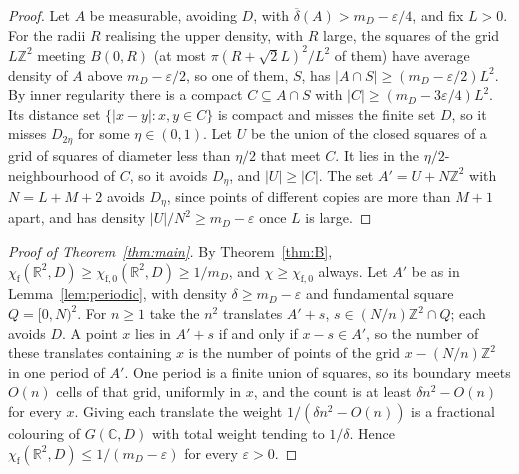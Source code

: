 \documentclass[11pt,a4paper]{amsart}
\theoremstyle{definition}
\theoremstyle{remark}
\newcommand{\C}{\mathbb{C}}
\newcommand{\R}{\mathbb{R}}
\newcommand{\Z}{\mathbb{Z}}
\newcommand{\dens}{\overline{\delta}}
\newcommand{\chif}{\chi_{\mathrm f}}
\begin{document}
\begin{proof}
Let $A$ be measurable, avoiding $D$, with $\dens(A)>m_D-\varepsilon/4$, and fix $L>0$. For the radii $R$ realising
the upper density, with $R$ large, the squares of the grid $L\Z^2$ meeting $B(0,R)$ (at most $\pi(R+\sqrt2L)^2/L^2$
of them) have average density of $A$ above $m_D-\varepsilon/2$, so one of them, $S$, has
$|A\cap S|\ge(m_D-\varepsilon/2)L^2$. By inner regularity there is a compact $C\subseteq A\cap S$ with
$|C|\ge(m_D-3\varepsilon/4)L^2$. Its distance set $\{|x-y|:x,y\in C\}$ is compact and misses the finite set $D$, so
it misses $D_{2\eta}$ for some $\eta\in(0,1)$. Let $U$ be the union of the closed squares of a grid of squares of
diameter less than $\eta/2$ that meet $C$. It lies in the $\eta/2$-neighbourhood of $C$, so it avoids $D_\eta$, and
$|U|\ge|C|$. The set $A'=U+N\Z^2$ with $N=L+M+2$ avoids $D_\eta$, since points of different copies are more than
$M+1$ apart, and has density $|U|/N^2\ge m_D-\varepsilon$ once $L$ is large.
\end{proof}

\begin{proof}[Proof of Theorem~\ref{thm:main}]
By Theorem~\ref{thm:B}, $\chif(\R^2,D)\ge\chi_{\mathrm f,0}(\R^2,D)\ge1/m_D$, and $\chi\ge\chi_{\mathrm f,0}$
always. Let $A'$ be as in Lemma~\ref{lem:periodic}, with density $\delta\ge m_D-\varepsilon$ and fundamental square
$Q=[0,N)^2$. For $n\ge1$ take the $n^2$ translates $A'+s$, $s\in(N/n)\Z^2\cap Q$; each avoids $D$. A point $x$ lies in
$A'+s$ if and only if $x-s\in A'$, so the number of these translates containing $x$ is the number of points of the
grid $x-(N/n)\Z^2$ in one period of $A'$. One period is a finite union of squares, so its boundary meets $O(n)$ cells
of that grid, uniformly in $x$, and the count is at least $\delta n^2-O(n)$ for every $x$. Giving each translate the
weight $1/(\delta n^2-O(n))$ is a fractional colouring of $G(\C,D)$ with total weight tending to $1/\delta$. Hence
$\chif(\R^2,D)\le1/(m_D-\varepsilon)$ for every $\varepsilon>0$.
\end{proof}
\end{document}
